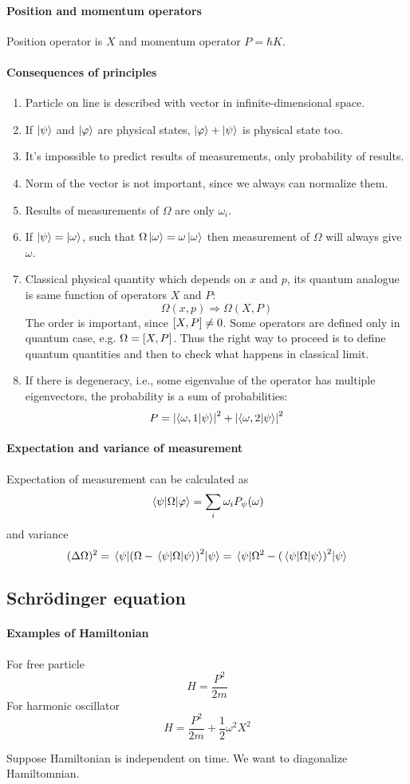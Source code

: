 \paragraph{Position and momentum operators}
Position operator is $X$ and momentum operator $P = \hbar K$.
\paragraph{Consequences of principles}
\begin{enumerate}
	\item Particle on line is described with vector in infinite-dimensional space.
	\item If $\ket{\psi}$ and $\ket{\varphi}$ are physical states, $\ket{\varphi} + \ket{\psi}$ is physical state too.
	\item It's impossible to predict results of measurements, only probability of results.
	\item Norm of the vector is not important, since we always can normalize them.
	\item Results of measurements of $\Omega$ are only $\omega_i$.
	\item If $\ket{\psi} = \ket{\omega}$, such that $\Omega \ket{\omega} = \omega\ket{\omega}$ then measurement of $\Omega$ will always give $\omega$.
	\item Classical physical quantity which depends on $x$ and $p$, its quantum analogue is same function of operators $X$ and $P$: 
	$$\Omega(x,p) \Rightarrow \Omega(X,P)$$
	The order is important, since $\comm{X}{P} \neq 0$. Some operators are defined only in quantum case, e.g. $\Omega = \comm{X}{P}$. Thus the right way to proceed is to define quantum quantities and then to check what happens in classical limit.
	\item If there is degeneracy, i.e., some eigenvalue of the operator has multiple eigenvectors, the probability is a sum of probabilities:
	$$P = \abs{\braket{\omega,1}{\psi}}^2 + \abs{\braket{\omega,2}{\psi}}^2$$
\end{enumerate}
\paragraph{Expectation and variance of measurement}
Expectation of measurement can be calculated as
$$\mel{\psi}{\Omega}{\varphi} = \sum_i \omega_i P_\psi(\omega)$$
and variance
$$(\Delta \Omega)^2 = \mel{\psi}{\qty(\Omega - \mel{\psi}{\Omega}{\psi})^2}{\psi} =  \mel{\psi}{\Omega^2 - \qty(\mel{\psi}{\Omega}{\psi})^2}{\psi}$$
\subsection{Schr\"{o}dinger equation}
\paragraph{Examples of Hamiltonian}
For free particle
$$H = \frac{P^2}{2m}$$
For harmonic oscillator
$$H = \frac{P^2}{2m} + \frac{1}{2}\omega^2 X^2$$

Suppose Hamiltonian is independent on time. We want to diagonalize Hamiltomnian.
